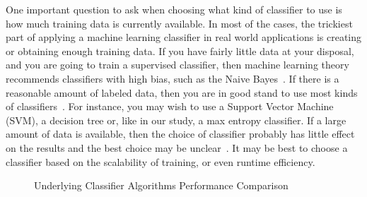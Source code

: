 One important question to ask when choosing what kind of classifier to use is how much training data is currently available. In most of the cases, the trickiest part of applying a machine learning classifier in real world applications is creating or obtaining enough training data. If you have fairly little data at your disposal, and you are going to train a supervised classifier, then machine learning theory recommends classifiers with high bias, such as the Naive Bayes~\cite{Forman2004PKDD,Ng2001NIPS}. If there is a reasonable amount of labeled data, then you are in good stand to use most kinds of classifiers~\cite{Manning2008book}. For instance, you may wish to use a Support Vector Machine (SVM), a decision tree or, like in our study, a max entropy classifier. If a large amount of data is available, then the choice of classifier probably has little effect on the results and the best choice may be unclear~\cite{Banko2001book}. It may be best to choose a classifier based on the scalability of training, or even runtime efficiency.

\clearpage
\begin{figure}[!thb]
  \centering
  \caption{Underlying Classifier Algorithms Performance Comparison}
  \label{chap4:fig:algorithms_comparison}
\end{figure}


